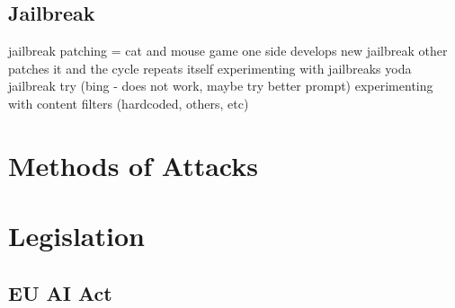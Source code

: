 \subsection{Jailbreak}
jailbreak patching = cat and mouse game
    one side develops new jailbreak
    other patches it and the cycle repeats itself
experimenting with jailbreaks
yoda jailbreak try (bing - does not work, maybe try better prompt)
experimenting with content filters (hardcoded, others, etc)

\section{Methods of Attacks}



\section{Legislation}

\subsection{EU AI Act}







